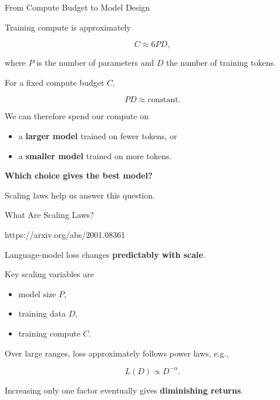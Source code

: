 \documentclass[11pt,compress,t,notes=noshow, xcolor=table]{beamer}
\begin{document}




\begin{vbframe}{From Compute Budget to Model Design}

Training compute is approximately

\[
C \approx 6PD,
\]

where $P$ is the number of parameters and $D$ the number of training tokens.

For a fixed compute budget $C$,

\[
PD \approx \text{constant}.
\]

We can therefore spend our compute on

\begin{itemize}
    \item a \textbf{larger model} trained on fewer tokens, or
    \item a \textbf{smaller model} trained on more tokens.
\end{itemize}

\begin{center}
\textbf{Which choice gives the best model?}
\end{center}

Scaling laws help us answer this question.

\end{vbframe}

\begin{vbframe}{What Are Scaling Laws?}

{https://arxiv.org/abs/2001.08361}

Language-model loss changes \textbf{predictably with scale}.

Key scaling variables are

\begin{itemize}
    \item model size $P$,
    \item training data $D$,
    \item training compute $C$.
\end{itemize}

Over large ranges, loss approximately follows power laws, e.g.,

\[
L(D) \propto D^{-\alpha}.
\]

Increasing only one factor eventually gives
\textbf{diminishing returns}.

\end{vbframe}
\end{document}
